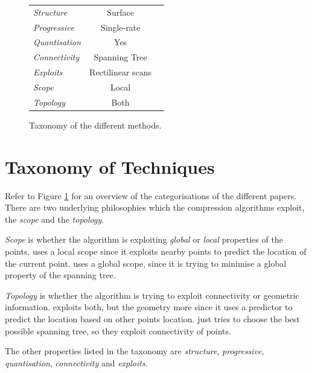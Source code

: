 \documentclass{report}
\begin{document}
\begin{figure}[t]
{\begin{tabular}{||l|c|c||}
  \hline

  \emph{Structure} & Surface & \\

  \emph{Progressive} & Single-rate & \\

  \emph{Quantisation} & Yes & \\

  \emph{Connectivity} & Spanning Tree & \\

  \emph{Exploits} & Rectilinear scans & \\

  \emph{Scope} & Local & \\

  \emph{Topology} & Both & \\

  \hline
\end{tabular}
}
\caption{Taxonomy of the different methods.}\label{fig:taxonomy}
\end{figure}


\section{Taxonomy of Techniques}

Refer to Figure \ref{fig:taxonomy} for an overview of the categorisations of
the different papers. There are two underlying philosophies which the
compression algorithms exploit, the \emph{scope} and the \emph{topology}.

\emph{Scope} is whether the algorithm is exploiting \emph{global} or
\emph{local} properties of the points. \citet{merrycomp} uses a local scope
since it exploits nearby points to predict the location of the current
point. \citet{chen2005lcp} uses a global scope, since it is trying to minimise
a global property of the spanning tree.

\emph{Topology} is whether the algorithm is trying to exploit connectivity or
geometric information. \citet{gumholdcomp} exploits both, but the geometry
more since it uses a predictor to predict the location based on other points
location. \citet{chen2005lcp} just tries to choose the best possible spanning
tree, so they exploit connectivity of points.

The other properties listed in the taxonomy are \emph{structure},
\emph{progressive}, \emph{quantisation}, \emph{connectivity} and
\emph{exploits}.
\end{document}
